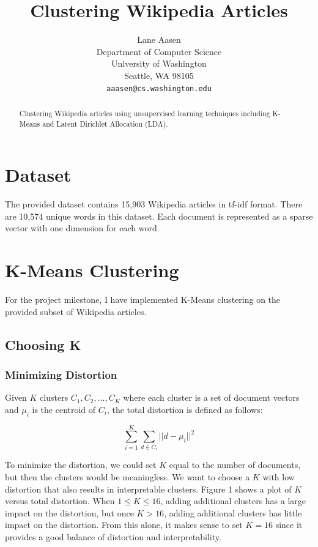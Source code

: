 \documentclass{article} %
\title{Clustering Wikipedia Articles}
\author{
Lane Aasen\\
Department of Computer Science\\
University of Washington\\
Seattle, WA 98105\\
\texttt{aaasen@cs.washington.edu}\\
}
\begin{document}
\maketitle

\begin{abstract}
Clustering Wikipedia articles using unsupervised learning techniques including K-Means and Latent Dirichlet Allocation (LDA).
\end{abstract}


\section{Dataset}

The provided dataset contains 15,903 Wikipedia articles in tf-idf format. There are 10,574 unique words in this dataset. Each document is represented as a sparse vector with one dimension for each word.

\section{K-Means Clustering}

For the project milestone, I have implemented K-Means clustering on the provided subset of Wikipedia articles.

\subsection{Choosing K}

\subsubsection{Minimizing Distortion}

Given $K$ clusters $C_{1},C_{2},...,C_{K}$ where each cluster is a set of document vectors and $\mu_{i}$ is the centroid of $C_{i}$, the total distortion is defined as follows:

$$\sum_{i=1}^{K}\sum_{d \in C_{i}} ||d - \mu_{i}||^{2}$$

To minimize the distortion, we could set $K$ equal to the number of documents, but then the clusters would be meaningless. We want to choose a $K$ with low distortion that also results in interpretable clusters. Figure 1 shows a plot of $K$ versus total distortion. When $1 \leq K \leq 16$, adding additional clusters has a large impact on the distortion, but once $K > 16$, adding additional clusters has little impact on the distortion. From this alone, it makes sense to set $K=16$ since it provides a good balance of distortion and interpretability.
\end{document}
